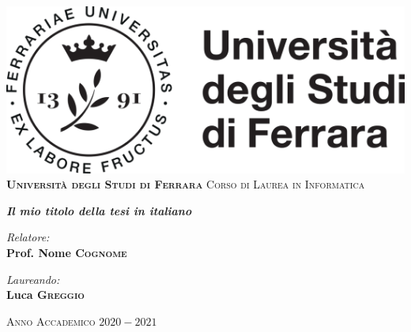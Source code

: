 \documentclass[a4paper, 12pt]{book}
\begin{document}

\begin{titlepage}
	\centering
	\vspace*{20mm}
	\includegraphics[scale=0.6]{./immagini/logo.png}\\
	\vspace*{1cm}
	\huge \textbf{\textsc{Università degli Studi di Ferrara}}
	\Large \textsc{Corso di Laurea in Informatica}
	
	\vspace*{1.5cm}
	\vspace*{10mm}
	\Huge \emph{\textbf{Il mio titolo della tesi in italiano}}
	\vspace*{10mm}
	
	\vspace*{15mm}
	\begin{minipage}{0.45\textwidth}
		\begin{flushleft} \Large
			\emph{Relatore:}\\
			\Large \textbf{Prof. Nome \textsc{Cognome}}
		\end{flushleft}
	\end{minipage}
	\begin{minipage}{0.45\textwidth}
		\begin{flushright} \Large
			\emph{Laureando:} \\
			\Large \textbf{Luca \textsc{Greggio}}
		\end{flushright}
	\end{minipage}
	
	\vspace*{20mm}
	\Large \textsc{Anno Accademico $2020-2021$}
\end{titlepage}
\restoregeometry
\end{document}
